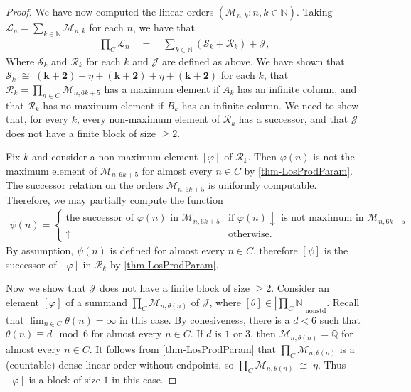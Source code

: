 \documentclass[11pt,a4paper,reqno]{amsart}
\theoremstyle{definition}
\newcommand{\da}{{\downarrow}}
\newcommand{\ua}{{\uparrow}}
\newcommand{\iso}{\cong}
\newcommand{\Nb}{\mathbb{N}}
\newcommand{\Qb}{\mathbb{Q}}
\newcommand{\mc}[1]{\mathcal{#1}}
\newcommand{\nonstd}{\mathrm{nonstd}}
\begin{document}
\begin{proof}
We have now computed the linear orders $(\mc{M}_{n,k} : n,k \in \Nb)$.  Taking $\mc{L}_n = \sum_{k \in \Nb}\mc{M}_{n,k}$ for each $n$, we have that
\begin{align*}
\prod\nolimits_C \mc{L}_n \quad=\quad \sum_{k \in \Nb} (\mc{S}_k + \mc{R}_k) + \mc{J},
\end{align*}
Where $\mc{S}_k$ and $\mc{R}_k$ for each $k$ and $\mc{J}$ are defined as above.  We have shown that $\mc{S}_k \;\iso\; (\bm{k+2}) + \eta + (\bm{k+2}) + \eta + (\bm{k+2})$ for each $k$, that $\mc{R}_k = \prod_{n \in C} \mc{M}_{n, 6k+5}$ has a maximum element if $A_k$ has an infinite column, and that $\mc{R}_k$ has no maximum element if $B_k$ has an infinite column.  We need to show that, for every $k$, every non-maximum element of $\mc{R}_k$ has a successor, and that $\mc{J}$ does not have a finite block of size $\geq\! 2$.

Fix $k$ and consider a non-maximum element $[\varphi]$ of $\mc{R}_k$.  Then $\varphi(n)$ is not the maximum element of $\mc{M}_{n, 6k+5}$ for almost every $n \in C$ by \cref{thm-LosProdParam}.  The successor relation on the orders $\mc{M}_{n, 6k+5}$ is uniformly computable.  Therefore, we may partially compute the function
\begin{align*}
\psi(n) =
\begin{cases}
\text{the successor of $\varphi(n)$ in $\mc{M}_{n, 6k+5}$} & \text{if $\varphi(n)\da$ is not maximum in $\mc{M}_{n, 6k+5}$}\\
\ua & \text{otherwise}.
\end{cases}
\end{align*}
By assumption, $\psi(n)$ is defined for almost every $n \in C$, therefore $[\psi]$ is the successor of $[\varphi]$ in $\mc{R}_k$ by \cref{thm-LosProdParam}.

Now we show that $\mc{J}$ does not have a finite block of size $\geq\! 2$.  Consider an element $[\varphi]$ of a summand $\prod_C \mc{M}_{n,\theta(n)}$ of $\mc{J}$, where $[\theta] \in \left|\prod_C \Nb \right|_\nonstd$.  Recall that $\lim_{n \in C}\theta(n) = \infty$ in this case.  By cohesiveness, there is a $d < 6$ such that $\theta(n) \equiv d \mod 6$ for almost every $n \in C$.  If $d$ is $1$ or $3$, then $\mc{M}_{n,\theta(n)} = \Qb$ for almost every $n \in C$.  It follows from \cref{thm-LosProdParam} that $\prod_C \mc{M}_{n,\theta(n)}$ is a (countable) dense linear order without endpoints, so $\prod_C \mc{M}_{n,\theta(n)} \;\iso\; \eta$.  Thus $[\varphi]$ is a block of size $1$ in this case.


\end{proof}
\end{document}
